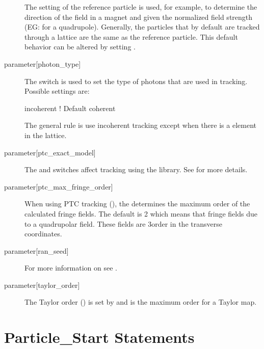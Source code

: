 \begin{description}
The setting of the reference particle is used, for example, to determine the direction of the field
in a magnet and given the normalized field strength (EG:  for a quadrupole).  Generally, the
particles that by default are tracked through a lattice are the same as the reference particle. This
default behavior can be altered by setting .

%
  \item[{parameter[photon_type]}] \Newline
The  switch is used to set the type of photons that are used in tracking. Possible
settings are:
\begin{example}
  incoherent    ! Default
  coherent 
\end{example}
The general rule is use incoherent tracking except when there is a  element in
the lattice.
%
  \item[{parameter[ptc_exact_model]}] \Newline
The  and  switches affect tracking using the 
library. See  for more details.
%
  \item[{parameter[ptc_max_fringe_order]}] \Newline
When using PTC tracking (), the  determines
the maximum order of the calculated fringe fields. The default is 2 which means that fringe fields
due to a quadrupolar field. These fields are 3\Rd order in the transverse coordinates.
%
  \item[{parameter[ran_seed]}] \Newline
For more information on  see .
%
  \item[{parameter[taylor_order]}] \Newline
The Taylor order () is set by  and is the maximum
order for a Taylor map.
  \end{description}

\section{Particle_Start Statements} 
\label{s:beam.start}

